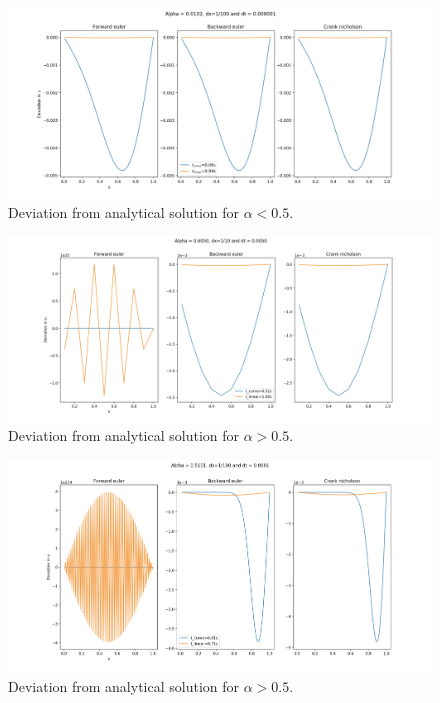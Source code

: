 \documentclass{article}
\begin{document}
\begin{figure}[H]
	\centering
	\includegraphics[width=180mm]{1_100}
	\caption{Deviation from analytical solution for $\alpha<0.5$.}
	\label{fig:1_100}
\end{figure}

\begin{figure}[H]
	\centering
	\includegraphics[width=180mm]{1_10_a}
	\caption{Deviation from analytical solution for $\alpha>0.5$.}
	\label{fig:1_10_a}
\end{figure}

\begin{figure}[H]
	\centering
	\includegraphics[width=140mm]{1_100_a}
	\caption{Deviation from analytical solution for $\alpha>0.5$.}
	\label{fig:1_100_a}
\end{figure}
\end{document}
